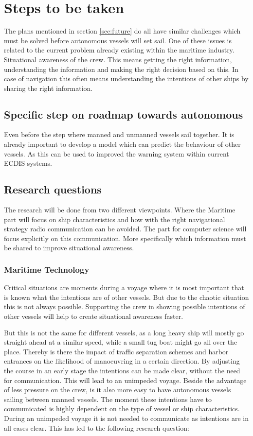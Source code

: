 \chapter{Steps to be taken}
The plans mentioned in section \ref{sec:future} do all have similar challenges which must be solved before autonomous vessels will set sail. One of these issues is related to the current problem already existing within the maritime industry. Situational awareness of the crew. This means getting the right information, understanding the information and making the right decision based on this. In case of navigation this often means understanding the intentions of other ships by sharing the right information.

\section{Specific step on roadmap towards autonomous}
Even before the step where manned and unmanned vessels sail together. It is already important to develop a model which can predict the behaviour of other vessels. As this can be used to improved the warning system within current ECDIS systems. 

\section{Research questions}
The research will be done from two different viewpoints. Where the Maritime part will focus on ship characteristics and how with the right navigational strategy radio communication can be avoided. The part for computer science will focus explicitly on this communication. More specifically which information must be shared to improve situational awareness.

\subsection{Maritime Technology}
Critical situations are moments during a voyage where it is most important that is known what the intentions are of other vessels. But due to the chaotic situation this is not always possible. Supporting the crew in showing possible intentions of other vessels will help to create situational awareness faster. 

But this is not the same for different vessels, as a long heavy ship will mostly go straight ahead at a similar speed, while a small tug boat might go all over the place. Thereby is there the impact of traffic separation schemes and harbor entrances on the likelihood of manoeuvring in a certain direction. 
By adjusting the course in an early stage the intentions can be made clear, without the need for communication. This will lead to an unimpeded voyage. Beside the advantage of less pressure on the crew, is it also more easy to have autonomous vessels sailing between manned vessels.
The moment these intentions have to communicated is highly dependent on the type of vessel or ship characteristics. During an unimpeded voyage it is not needed to communicate as intentions are in all cases clear. This has led to the following research question:

